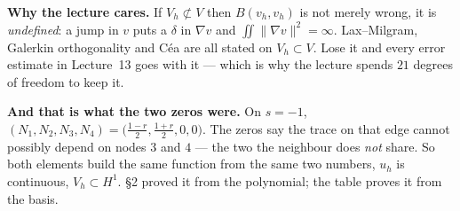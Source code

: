 \documentclass[11pt]{article}
\newcommand{\grad}{\nabla}
\begin{document}
{{\medskip
\textbf{Why the lecture cares.} If $V_{h}\not\subset V$ then $B(v_{h},v_{h})$
is not merely wrong, it is \emph{undefined}: a jump in $v$ puts a $\delta$ in
$\grad v$ and $\iint\|\grad v\|^{2}=\infty$. Lax--Milgram, Galerkin
orthogonality and C\'ea are all stated on $V_{h}\subset V$. Lose it and every
error estimate in Lecture~13 goes with it --- which is why the lecture spends
$21$ degrees of freedom to keep it.

\medskip
\textbf{And that is what the two zeros were.} On $s=-1$,
$(N_{1},N_{2},N_{3},N_{4})=\bigl(\tfrac{1-r}{2},\tfrac{1+r}{2},0,0\bigr)$. The
zeros say the trace on that edge cannot possibly depend on nodes $3$ and $4$
--- the two the neighbour does \emph{not} share. So both elements build the
same function from the same two numbers, $u_{h}$ is continuous, $V_{h}\subset
H^{1}$. \S2 proved it from the polynomial; the table proves it from the
basis.}}
\end{document}
